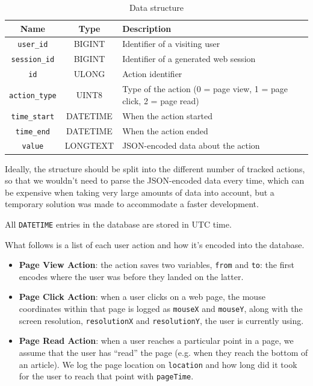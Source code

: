 \documentclass[sigconf,nonacm]{acmart}
\begin{document}
\begin{table}[h]
  \centering

  \begin{tabular}{ | c | c | L | }
    \hline
    Name                  & Type     & Description                                 \\ \hline
    \texttt{user\_id}     & BIGINT   & Identifier of a visiting user               \\ \hline
    \texttt{session\_id}  & BIGINT   & Identifier of a generated web session       \\ \hline
    \texttt{id}           & ULONG    & Action identifier                           \\ \hline
    \texttt{action\_type} & UINT8    & Type of the action (0 = page view, 1 = page
    click, 2 = page read)                                                          \\ \hline
    \texttt{time\_start}  & DATETIME & When the action started                     \\ \hline
    \texttt{time\_end}    & DATETIME & When the action ended                       \\ \hline
    \texttt{value}        & LONGTEXT & JSON-encoded data about the action          \\ \hline
  \end{tabular}

  \caption{Data structure}
  \label{tbl:data-structure}
\end{table}

Ideally, the structure should be split into the different number of
tracked actions, so that we wouldn't need to parse the JSON-encoded data every
time, which can be expensive when taking very large amounts of data into
account, but a temporary solution was made to accommodate a faster development.

All \texttt{DATETIME} entries in the database are stored in UTC time.

What follows is a list of each user action and how it's encoded into the
database.

\begin{itemize}
  \item \textbf{Page View Action}: the action saves two variables, \texttt{from} and
        \texttt{to}: the first encodes where the user was before they landed on the
        latter.
  \item \textbf{Page Click Action}: when a user clicks on a web page, the mouse coordinates
        within that page is logged as \texttt{mouseX} and \texttt{mouseY}, along with
        the screen resolution, \texttt{resolutionX} and \texttt{resolutionY}, the user
        is currently using.
  \item \textbf{Page Read Action}: when a user reaches a particular point in a page, we
        assume that the user has ``read'' the page (e.g. when they reach the bottom of
        an article). We log the page location on \texttt{location} and how long did it
        took for the user to reach that point with \texttt{pageTime}.
\end{itemize}
\end{document}
